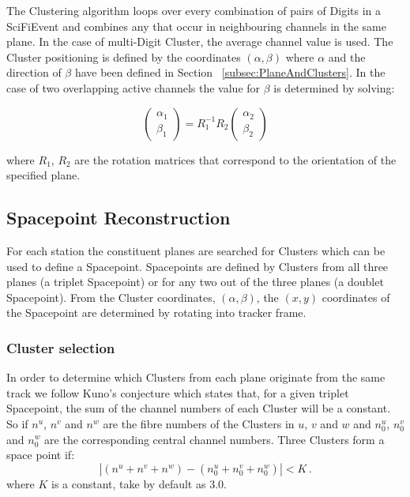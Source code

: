   The Clustering algorithm loops over every combination of pairs of Digits in a SciFiEvent and combines any that occur in neighbouring channels in the same plane. In the case of multi-Digit Cluster, the average channel value is used. The Cluster positioning is defined by the coordinates $(\alpha, \beta)$ where $\alpha$ and the direction of $\beta$ have been defined in Section ~\ref{subsec:PlaneAndClusters}. In the case of two overlapping active channels the value for $\beta$ is determined by solving:
  
  \begin{equation}
    \begin{pmatrix}
     \alpha_1 \\ \beta_1
    \end{pmatrix} = R_{1}^{-1} R_2
    \begin{pmatrix}
      \alpha_2 \\ \beta_2
    \end{pmatrix}
  \end{equation}
  
  \noindent
  where $R_1$, $R_2$ are the rotation matrices that correspond to the orientation of the specified plane. 

  \subsection{Spacepoint Reconstruction}
  \label{subsec:SpacepointReconstruction}
  For each station the constituent planes are searched for Clusters which can be used to define a Spacepoint. Spacepoints are defined by Clusters from all three planes (a triplet Spacepoint) or for any two out of the three planes (a doublet Spacepoint). 
  From the Cluster coordinates, $(\alpha, \beta)$, the $(x, y)$ coordinates of the Spacepoint are determined by rotating into tracker frame.

  \subsubsection{Cluster selection}
  \label{subsubsec:ClusterSelection}
  In order to determine which Clusters from each plane originate from the same track we follow Kuno's conjecture\cite{MiceTrackers} which states that, for a given triplet Spacepoint, the sum of the channel numbers of each Cluster will be a constant.  So if $n^u$, $n^v$ and $n^w$ are the fibre numbers of the Clusters in $u$, $v$ and $w$ and $n^u_0$, $n^v_0$ and $n^w_0$ are the corresponding central channel numbers. Three Clusters form a space point  if:
  \begin{equation}
    | (n^u + n^v + n^w) - (n^u_0 + n^v_0 + n^w_0) | < K \, .
  \end{equation}
  where $K$ is a constant, take by default as 3.0.
  
